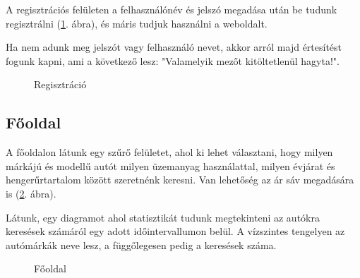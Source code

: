 A regisztrációs felületen a felhasználónév és jelszó megadása után be tudunk regisztrálni (\ref{fig:Regisztráció}. ábra), és máris tudjuk használni a weboldalt.

Ha nem adunk meg jelszót vagy felhasználó nevet, akkor arról majd értesítést fogunk kapni, ami a következő lesz: "Valamelyik mezőt kitöltetlenül hagyta!".

\begin{figure}[h]
\centering
{}
\caption{Regisztráció}
\label{fig:Regisztráció}
\end{figure}

\newpage
\subsection{Főoldal}

A főoldalon látunk egy szűrő felületet, ahol ki lehet választani, hogy milyen márkájú és modellű autót milyen üzemanyag használattal, milyen évjárat és hengerűrtartalom között szeretnénk keresni. Van lehetőség az ár sáv megadására is (\ref{fig:Fooldal}. ábra).

Látunk, egy diagramot ahol statisztikát tudunk megtekinteni az autókra keresések számáról egy adott időintervallumon belül. A vízszintes tengelyen az autómárkák neve lesz, a függőlegesen pedig a keresések száma.

\begin{figure}[h]
\centering
{}
\caption{Főoldal}
\label{fig:Fooldal}
\end{figure}


